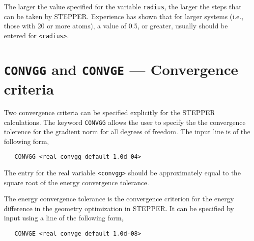 The larger the value specified for the variable \verb+radius+, the
larger the steps that can be taken by STEPPER.  Experience has shown
that for larger systems (i.e., those with 20 or more atoms), a value
of 0.5, or greater, usually should be entered for \verb+<radius>+.

\section{{\tt CONVGG} and {\tt CONVGE} --- Convergence criteria}

Two convergence criteria can be specified explicitly for the 
STEPPER calculations.  The keyword \verb+CONVGG+ allows the user to
specify the the convergence tolerence for the gradient norm for
all degrees of freedom.  The input line is of the following form,
\begin{verbatim}
   CONVGG <real convgg default 1.0d-04>
\end{verbatim}
The entry for the real variable \verb+<convgg>+ should be approximately 
equal to the square root of the energy convergence tolerance.

The energy convergence tolerance is the convergence criterion for the 
energy difference in the geometry optimization in STEPPER.  It can be
specified by input using a line of the following form,
\begin{verbatim}
   CONVGE <real convge default 1.0d-08>
\end{verbatim}


